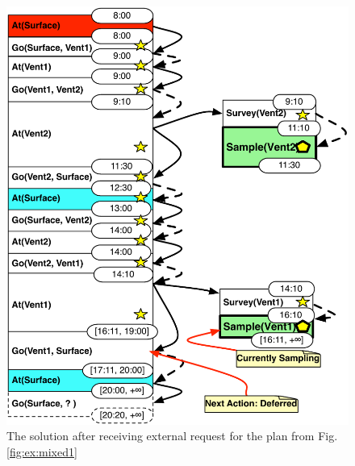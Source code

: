 
\begin{figure}[!htbp]
  \centering
  \includegraphics[width=0.8\columnwidth]{figs/example_MixedUpdate}
  \caption{\small The solution after receiving external request for
    the plan from Fig. \ref{fig:ex:mixed1}}
  \label{fig:ex:mixed2}
\end{figure}


